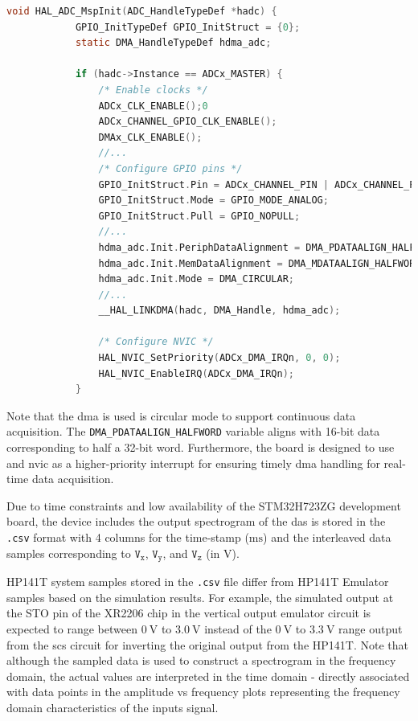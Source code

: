 \documentclass[class=report,11pt,crop=false]{standalone}
\begin{document}
	\begin{lstlisting}[language=C, label={lst:das-callbacks}, caption={Showing conversion callbacks for processing \acrshort{adc} data when the \acrshort{dma} fills half.}]
		void HAL_ADC_MspInit(ADC_HandleTypeDef *hadc) {
			GPIO_InitTypeDef GPIO_InitStruct = {0};
			static DMA_HandleTypeDef hdma_adc;
			
			if (hadc->Instance == ADCx_MASTER) {
				/* Enable clocks */
				ADCx_CLK_ENABLE();0
				ADCx_CHANNEL_GPIO_CLK_ENABLE();
				DMAx_CLK_ENABLE();
				//...
				/* Configure GPIO pins */
				GPIO_InitStruct.Pin = ADCx_CHANNEL_PIN | ADCx_CHANNEL_PIN2 | ADCx_CHANNEL_PIN3;
				GPIO_InitStruct.Mode = GPIO_MODE_ANALOG;
				GPIO_InitStruct.Pull = GPIO_NOPULL;
				//...
				hdma_adc.Init.PeriphDataAlignment = DMA_PDATAALIGN_HALFWORD; // 16-bit
				hdma_adc.Init.MemDataAlignment = DMA_MDATAALIGN_HALFWORD;
				hdma_adc.Init.Mode = DMA_CIRCULAR;
				//...
				__HAL_LINKDMA(hadc, DMA_Handle, hdma_adc);
				
				/* Configure NVIC */
				HAL_NVIC_SetPriority(ADCx_DMA_IRQn, 0, 0);
				HAL_NVIC_EnableIRQ(ADCx_DMA_IRQn);
			}
	\end{lstlisting}
	Note that the \acrshort{dma} is used is circular mode to support continuous data acquisition. The \texttt{DMA\_PDATAALIGN\_HALFWORD} variable aligns with 16-bit data corresponding to half a 32-bit word. Furthermore, the board is designed to use and \acrfull{nvic} as a higher-priority interrupt for ensuring timely \acrshort{dma} handling for real-time data acquisition. 
	
	Due to time constraints and low availability of the STM32H723ZG development board, the device includes the output spectrogram of the \acrshort{das} is stored in the \texttt{.csv} format with 4 columns for the time-stamp ($\si{\milli\second}$) and the interleaved data samples corresponding to $\texttt{V}_\texttt{x}$, $\texttt{V}_\texttt{y}$, and $\texttt{V}_\texttt{z}$ (in $\si{\volt}$). 
	
	HP141T system samples stored in the \texttt{.csv} file differ from HP141T Emulator samples based on the simulation results. For example, the simulated output at the STO pin of the XR2206 chip in the vertical output emulator circuit is expected to range between $\SI{0}{\volt}$ to $\SI{3.0}{\volt}$ instead of the $\SI{0}{\volt}$ to $\SI{3.3}{\volt}$ range output from the \acrshort{scs} circuit for inverting the original output from the HP141T. Note that although the sampled data is used to construct a spectrogram in the frequency domain, the actual values are interpreted in the time domain - directly associated with data points in the amplitude vs frequency plots representing the frequency domain characteristics of the inputs signal. 
	
\end{document}
